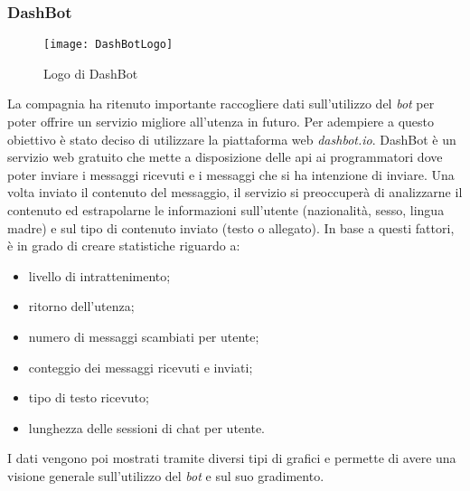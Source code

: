 \subsubsection{DashBot}
\begin{figure}[H]
  \centering
  \texttt{[image: DashBotLogo]}
  \caption{Logo di DashBot}
\end{figure}
La compagnia ha ritenuto importante raccogliere dati sull'utilizzo del
\textit{bot} per poter offrire un servizio migliore all'utenza in futuro. Per
adempiere a questo obiettivo è stato deciso di utilizzare la piattaforma web
\textit{dashbot.io}. DashBot è un servizio web gratuito che mette a
disposizione delle \gls{api} ai programmatori dove poter inviare i messaggi
ricevuti e i messaggi che si ha intenzione di inviare. Una volta inviato il
contenuto del messaggio, il servizio si preoccuperà di analizzarne il contenuto
ed estrapolarne le informazioni sull'utente (nazionalità, sesso, lingua madre)
e sul tipo di contenuto inviato (testo o allegato). In base a questi fattori, è
in grado di creare statistiche riguardo a:
\begin{itemize}
  \item livello di intrattenimento;
  \item ritorno dell'utenza;
  \item numero di messaggi scambiati per utente;
  \item conteggio dei messaggi ricevuti e inviati;
  \item tipo di testo ricevuto;
  \item lunghezza delle sessioni di chat per utente.
\end{itemize}
I dati vengono poi mostrati tramite diversi tipi di grafici e permette di avere
una visione generale sull'utilizzo del \textit{bot} e sul suo gradimento.
